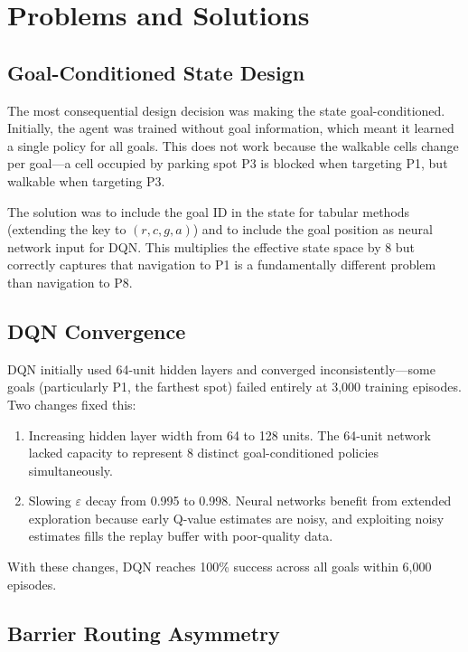 \documentclass[letterpaper]{article}
\begin{document}
\section{Problems and Solutions}

\subsection{Goal-Conditioned State Design}

The most consequential design decision was making the state goal-conditioned. Initially, the agent was trained without goal information, which meant it learned a single policy for all goals. This does not work because the walkable cells change per goal---a cell occupied by parking spot P3 is blocked when targeting P1, but walkable when targeting P3.

The solution was to include the goal ID in the state for tabular methods (extending the key to $(r, c, g, a)$) and to include the goal position as neural network input for DQN. This multiplies the effective state space by 8 but correctly captures that navigation to P1 is a fundamentally different problem than navigation to P8.

\subsection{DQN Convergence}

DQN initially used 64-unit hidden layers and converged inconsistently---some goals (particularly P1, the farthest spot) failed entirely at 3,000 training episodes. Two changes fixed this:

\begin{enumerate}
    \item Increasing hidden layer width from 64 to 128 units. The 64-unit network lacked capacity to represent 8 distinct goal-conditioned policies simultaneously.
    \item Slowing $\varepsilon$ decay from 0.995 to 0.998. Neural networks benefit from extended exploration because early Q-value estimates are noisy, and exploiting noisy estimates fills the replay buffer with poor-quality data.
\end{enumerate}

With these changes, DQN reaches 100\% success across all goals within 6,000 episodes.

\subsection{Barrier Routing Asymmetry}
\end{document}
